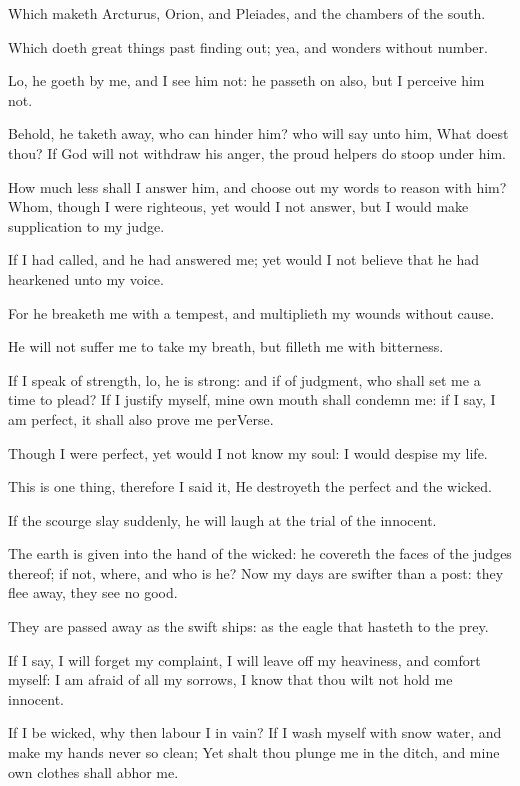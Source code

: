 \Verse Which maketh Arcturus, Orion, and Pleiades, and the chambers of the south.

\Verse Which doeth great things past finding out; yea, and wonders without number.

\Verse Lo, he goeth by me, and I see him not: he passeth on also, but I perceive him not.

\Verse Behold, he taketh away, who can hinder him? who will say unto him, What doest thou?  \Verse If God will not withdraw his anger, the proud helpers do stoop under him.

\Verse How much less shall I answer him, and choose out my words to reason with him?  \Verse Whom, though I were righteous, yet would I not answer, but I would make supplication to my judge.

\Verse If I had called, and he had answered me; yet would I not believe that he had hearkened unto my voice.

\Verse For he breaketh me with a tempest, and multiplieth my wounds without cause.

\Verse He will not suffer me to take my breath, but filleth me with bitterness.

\Verse If I speak of strength, lo, he is strong: and if of judgment, who shall set me a time to plead?  \Verse If I justify myself, mine own mouth shall condemn me: if I say, I am perfect, it shall also prove me perVerse.

\Verse Though I were perfect, yet would I not know my soul: I would despise my life.

\Verse This is one thing, therefore I said it, He destroyeth the perfect and the wicked.

\Verse If the scourge slay suddenly, he will laugh at the trial of the innocent.

\Verse The earth is given into the hand of the wicked: he covereth the faces of the judges thereof; if not, where, and who is he?  \Verse Now my days are swifter than a post: they flee away, they see no good.

\Verse They are passed away as the swift ships: as the eagle that hasteth to the prey.

\Verse If I say, I will forget my complaint, I will leave off my heaviness, and comfort myself: \Verse I am afraid of all my sorrows, I know that thou wilt not hold me innocent.

\Verse If I be wicked, why then labour I in vain?  \Verse If I wash myself with snow water, and make my hands never so clean; \Verse Yet shalt thou plunge me in the ditch, and mine own clothes shall abhor me.

